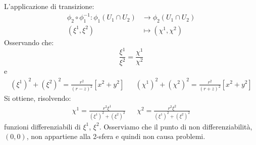 L'applicazione di transizione:
\begin{align*}
    \phi_2 \circ \phi_1^{-1} : \phi_1 (U_1 \cap U_2) &\rightarrow \phi_2 (U_1 \cap U_2) \\
     (\xi^1, \xi^2) &\mapsto (\chi^1, \chi^2)
\end{align*}
Osservando che:
\begin{equation*}
    \frac{\xi^1}{\xi^2} = \frac{\chi^1}{\chi^2}
\end{equation*}
e 
\begin{align*}
    (\xi^1)^2 + (\xi^2)^2 = \frac{r^2}{(r-z)^2} \left[ x^2 + y^2\right] && 
    (\chi^1)^2 + (\chi^2)^2 = \frac{r^2}{(r+z)^2} \left[ x^2 + y^2\right]
\end{align*}
Si ottiene, risolvendo:
\begin{align*}
    \chi^1 = \frac{r^2 \xi^1}{(\xi^1)^2 + (\xi^2)^2} &&
    \chi^2 = \frac{r^2\xi^2}{(\xi^1)^2 + (\xi^2)^2}
\end{align*}
funzioni differenziabili di $\xi^1$, $\xi^2$. Osserviamo che il punto di non differenziabilità, $(0,0)$, non appartiene alla 2-sfera e quindi non causa problemi.
